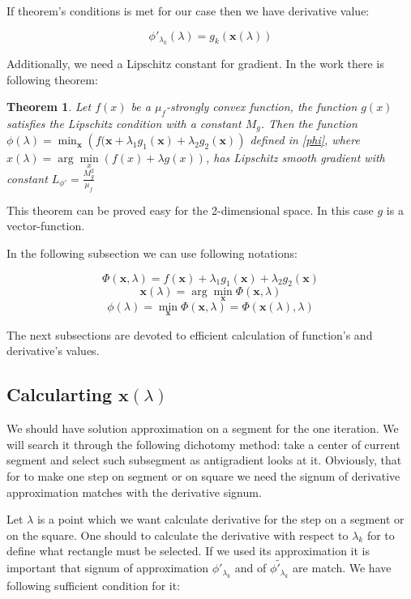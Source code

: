 \documentclass[12pt]{article}
\newtheorem{theorem}{Theorem}[section]
\begin{document}
If theorem's conditions is met for our case then we have derivative value:

\begin{equation}
\phi'_{\lambda_k}(\lambda) = g_k\left(\textbf{x}(\lambda)\right)
\end{equation}

Additionally, we need a Lipschitz constant for gradient. In the work \cite{Stonykin} there is following theorem:
\begin{theorem}
Let $f(x)$ be a $\mu_f$-strongly convex function, the function $g(x)$ satisfies the Lipschitz condition with a constant $M_g$. Then the function $\phi(\lambda) = \min_\textbf{x}\left(f(\textbf{x}+\lambda_1g_1(\textbf{x}) + \lambda_2g_2(\textbf{x})\right)$ defined in \ref{phi}, where $x(\lambda) = \arg\min\limits_x(f(x)+\lambda g(x))$, has Lipschitz smooth gradient with constant $L_{\phi'} = \frac{M_g^2}{\mu_f}$
\end{theorem}

This theorem can be proved easy for the 2-dimensional space. In this case $g$ is a vector-function.

In the following subsection we can use following notations:

$$\Phi(\textbf{x},\lambda) = f(\textbf{x}) + \lambda_1g_1(\textbf{x}) + \lambda_2g_2(\textbf{x})$$
$$\textbf{x}(\lambda) = \arg\min_\textbf{x}\Phi(\textbf{x}, \lambda)$$
$$\phi(\lambda) = \min_\textbf{x} \Phi(\textbf{x}, \lambda) = \Phi(\textbf{x}(\lambda), \lambda)$$

The next subsections are devoted to efficient calculation of function's and derivative's values.

\subsection{Calcularting $\textbf{x}(\lambda)$}

We should have solution approximation on a segment for the one iteration. We will search it through the following dichotomy method: take a center of current segment and select such subsegment as antigradient looks at it. Obviously, that for to make one step on segment or on square we need the signum of derivative approximation matches with the derivative signum.

Let $\lambda$ is a point which we want calculate derivative for the step on a segment or on the square. One should to calculate the derivative with respect to $\lambda_k$ for to define what rectangle must be selected. If we used its approximation it is important that signum of approximation $\phi'_{\lambda_k}$ and of $\widetilde{\phi'_{\lambda_k}}$ are match. We have following sufficient condition for it:
\end{document}
